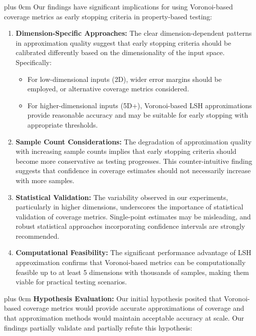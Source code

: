 \documentclass[conference]{IEEEtran}
\newcommand{\justifytext}{\leftskip=0pt \rightskip=0pt plus 0cm}
\begin{document}
\justifytext
Our findings have significant implications for using Voronoi-based coverage metrics as early stopping criteria in property-based testing:

\begin{enumerate}
    \item \textbf{Dimension-Specific Approaches:} The clear dimension-dependent patterns in approximation quality suggest that early stopping criteria should be calibrated differently based on the dimensionality of the input space. Specifically:
    \begin{itemize}
        \item For low-dimensional inputs (2D), wider error margins should be employed, or alternative coverage metrics considered.
        \item For higher-dimensional inputs (5D+), Voronoi-based LSH approximations provide reasonable accuracy and may be suitable for early stopping with appropriate thresholds.
    \end{itemize}
    
    \item \textbf{Sample Count Considerations:} The degradation of approximation quality with increasing sample counts implies that early stopping criteria should become more conservative as testing progresses. This counter-intuitive finding suggests that confidence in coverage estimates should not necessarily increase with more samples.
    
    \item \textbf{Statistical Validation:} The variability observed in our experiments, particularly in higher dimensions, underscores the importance of statistical validation of coverage metrics. Single-point estimates may be misleading, and robust statistical approaches incorporating confidence intervals are strongly recommended.
    
    \item \textbf{Computational Feasibility:} The significant performance advantage of LSH approximation confirms that Voronoi-based metrics can be computationally feasible up to at least 5 dimensions with thousands of samples, making them viable for practical testing scenarios.
\end{enumerate}

\justifytext
\textbf{Hypothesis Evaluation:} Our initial hypothesis posited that Voronoi-based coverage metrics would provide accurate approximations of coverage and that approximation methods would maintain acceptable accuracy at scale. Our findings partially validate and partially refute this hypothesis:
\end{document}
